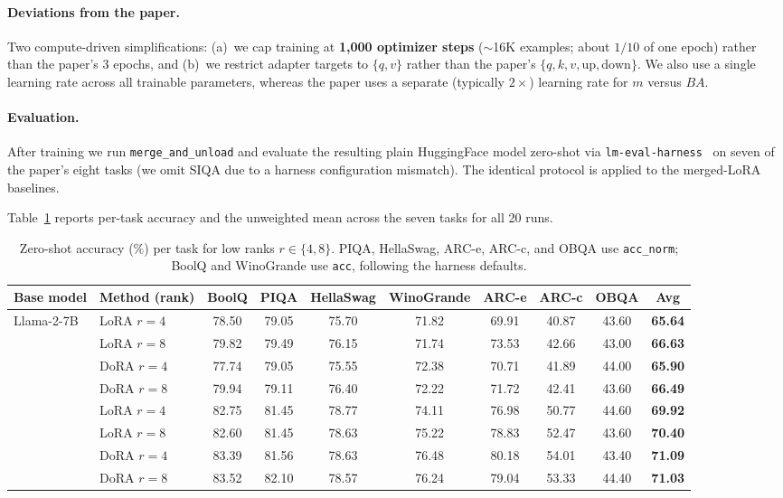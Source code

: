 \documentclass[11pt,twocolumn]{article}
\begin{document}
\paragraph{Deviations from the paper.} Two compute-driven simplifications:
(a)~we cap training at \textbf{1{,}000 optimizer steps} ($\sim$16K
examples; about $1/10$ of one epoch) rather than the paper's 3 epochs,
and (b)~we restrict adapter targets to $\{q,v\}$ rather than the paper's
$\{q,k,v,\text{up},\text{down}\}$. We also use a single learning rate
across all trainable parameters, whereas the paper uses a separate
(typically $2{\times}$) learning rate for $m$ versus $BA$.
\vspace{-1em}
\paragraph{Evaluation.}
After training we run \texttt{merge\_and\_unload} and evaluate the
resulting plain HuggingFace model zero-shot via
\texttt{lm-eval-harness}~\cite{eval-harness} on seven of the paper's
eight tasks (we omit SIQA due to a harness configuration mismatch). The
identical protocol is applied to the merged-LoRA baselines.


Table~\ref{tab:results} reports per-task accuracy and the unweighted
mean across the seven tasks for all 20 runs.

\begin{table}[t]
\centering
\footnotesize
\setlength{\tabcolsep}{4pt}
\begin{tabular}{llcccccccc}
\toprule
Base model & Method (rank) & BoolQ & PIQA & HellaSwag & WinoGrande & ARC-e & ARC-c & OBQA & \textbf{Avg} \\
\midrule
\multirow{10}{*}{Llama-2-7B}
 & LoRA $r{=}4$   & 78.50 & 79.05 & 75.70 & 71.82 & 69.91 & 40.87 & 43.60 & \textbf{65.64} \\
 & LoRA $r{=}8$   & 79.82 & 79.49 & 76.15 & 71.74 & 73.53 & 42.66 & 43.00 & \textbf{66.63} \\
 & DoRA $r{=}4$   & 77.74 & 79.05 & 75.55 & 72.38 & 70.71 & 41.89 & 44.00 & \textbf{65.90} \\
 & DoRA $r{=}8$   & 79.94 & 79.11 & 76.40 & 72.22 & 71.72 & 42.41 & 43.60 & \textbf{66.49} \\
\midrule
\multirow{10}{*}{Llama-3-8B}
 & LoRA $r{=}4$   & 82.75 & 81.45 & 78.77 & 74.11 & 76.98 & 50.77 & 44.60 & \textbf{69.92} \\
 & LoRA $r{=}8$   & 82.60 & 81.45 & 78.63 & 75.22 & 78.83 & 52.47 & 43.60 & \textbf{70.40} \\
 & DoRA $r{=}4$   & 83.39 & 81.56 & 78.63 & 76.48 & 80.18 & 54.01 & 43.40 & \textbf{71.09} \\
 & DoRA $r{=}8$   & 83.52 & 82.10 & 78.57 & 76.24 & 79.04 & 53.33 & 44.40 & \textbf{71.03} \\
\bottomrule
\end{tabular}
\caption{Zero-shot accuracy (\%) per task for low ranks $r\in\{4,8\}$. PIQA, HellaSwag, ARC-e, ARC-c, and OBQA use \texttt{acc\_norm}; BoolQ and WinoGrande use \texttt{acc}, following the harness defaults.}
\label{tab:results}
\end{table}
\end{document}
